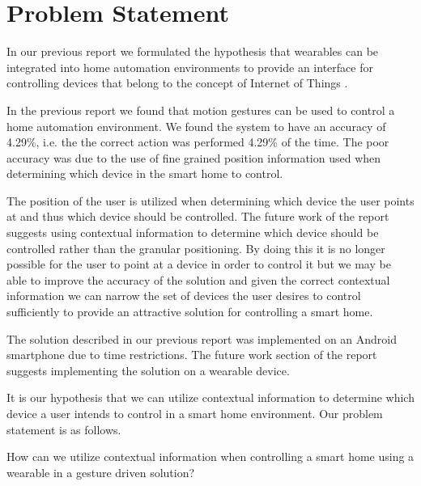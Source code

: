 \section{Problem Statement}
\label{sec:problem-statement}

In our previous report we formulated the hypothesis that wearables can be integrated into home automation environments to provide an interface for controlling devices that belong to the concept of Internet of Things \cite[pp. 14]{prespecialisation}.

In the previous report \cite[pp. 69-73]{prespecialisation} we found that motion gestures can be used to control a home automation environment. We found the system to have an accuracy of 4.29\%, i.e. the the correct action was performed 4.29\% of the time. The poor accuracy was due to the use of fine grained position information used when determining which device in the smart home to control.

The position of the user is utilized when determining which device the user points at and thus which device should be controlled. The future work of the report \cite[pp. 71-73]{prespecialisation} suggests using contextual information to determine which device should be controlled rather than the granular positioning. By doing this it is no longer possible for the user to point at a device in order to control it but we may be able to improve the accuracy of the solution and given the correct contextual information we can narrow the set of devices the user desires to control sufficiently to provide an attractive solution for controlling a smart home.

The solution described in our previous report was implemented on an Android smartphone due to time restrictions. The future work section of the report suggests implementing the solution on a wearable device.

It is our hypothesis that we can utilize contextual information to determine which device a user intends to control in a smart home environment. Our problem statement is as follows.

\begin{framed}
  How can we utilize contextual information when controlling a smart home using a wearable in a gesture driven solution?
\end{framed}


